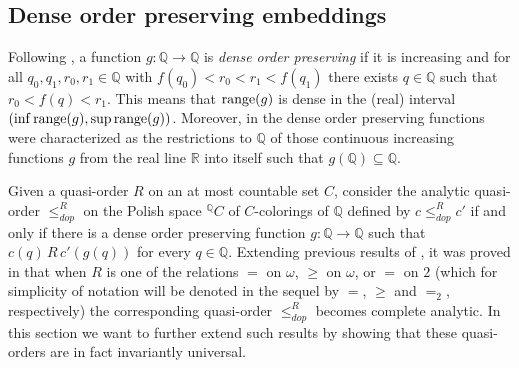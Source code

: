 \documentclass{amsart}
\theoremstyle{definition}
\theoremstyle{remark}
\begin{document}
\subsection{Dense order preserving embeddings}\label{dop}

Following \cite{MarRos}, a function $g \colon {\mathbb{Q}} \to {\mathbb{Q}}$ is
\emph{dense order preserving} if it is increasing and for all
$q_0,q_1,r_0,r_1 \in {\mathbb{Q}}$ with $f(q_0) < r_0 < r_1 < f(q_1)$ there
exists $q \in {\mathbb{Q}}$ such that $r_0 < f(q) < r_1$. This means that ${\rm
  range}(g)$ is dense in the (real) interval $(\inf {\rm range}(g),
\sup {\rm range}(g))$. Moreover, in \cite{MarRos} the dense order
preserving functions were characterized as the restrictions to ${\mathbb{Q}}$ of
those continuous increasing functions $g$ from the real line ${\mathbb{R}}$
into itself such
that $g({\mathbb{Q}}) \subseteq {\mathbb{Q}}$.

Given a quasi-order $R$ on an at most countable set $C$, consider the
analytic quasi-order $\leq_{dop}^R$ on the Polish space ${}^{\mathbb{Q}} C$ of
$C$-colorings of ${\mathbb{Q}}$ defined by $c \leq_{dop}^R c'$ if and only if
there is a dense order preserving function $g \colon {\mathbb{Q}} \to {\mathbb{Q}}$ such
that $c(q)\, R\, c'(g(q))$ for every $q \in {\mathbb{Q}}$. Extending previous
results of \cite{MarRos}, it was proved in \cite{Camerlo} that when $R$ is one of the
relations $=$ on
$\omega$, $\geq$ on
$\omega$, or $=$ on $2$ (which for simplicity of notation will be
denoted in the sequel by $=$, $\geq$ and $=_2$, respectively) the
corresponding quasi-order $\leq_{dop}^R$
becomes complete analytic. In this section we want to further extend
such results by showing that these quasi-orders are in fact invariantly universal.
\end{document}
